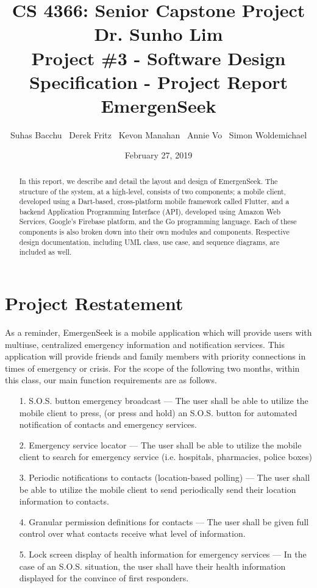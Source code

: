 \documentclass[10pt, a4paper]{article}
\title{\large CS 4366: Senior Capstone Project \\ Dr. Sunho Lim \\ Project \#3 - Software Design Specification - Project Report \\ EmergenSeek}
\author{Suhas Bacchu \ Derek Fritz \ Kevon Manahan \ Annie Vo \ Simon Woldemichael}
\date{February 27, 2019}
\begin{document}
\maketitle
\vspace{-1cm}
\begin{abstract}
In this report, we describe and detail the layout and design of EmergenSeek. The structure of the system, at a high-level, consists of two components; a mobile client, developed using a Dart-based, cross-platform mobile framework called Flutter, and a backend Application Programming Interface (API), developed using Amazon Web Services, Google's Firebase platform, and the Go programming language. Each of these components is also broken down into their own modules and components. Respective design documentation, including UML class, use case, and sequence diagrams, are included as well.
\end{abstract}

\section{Project Restatement}
As a reminder, EmergenSeek is a mobile application which will provide users with multiuse, centralized emergency information and notification services. This application will provide friends and family members with priority connections in times of emergency or crisis. For the scope of the following two months, within this class, our main function requirements are as follows.
\begin{enumerate}
	\item[1.] S.O.S. button emergency broadcast --- The user shall be able to utilize the mobile client to press, (or press and hold) an S.O.S. button for automated notification of contacts and emergency services.
	\item[2.] Emergency service locator --- The user shall be able to utilize the mobile client to search for emergency service (i.e. hospitals, pharmacies, police boxes)
	\item[3.] Periodic notifications to contacts (location-based polling) --- The user shall be able to utilize the mobile client to send periodically send their location information to contacts.
	\item[4.] Granular permission definitions for contacts --- The user shall be given full control over what contacts receive what level of information.
	\item[5.] Lock screen display of health information for emergency services --- In the case of an S.O.S. situation, the user shall have their health information displayed for the convince of first responders.
\end{enumerate}
\end{document}
